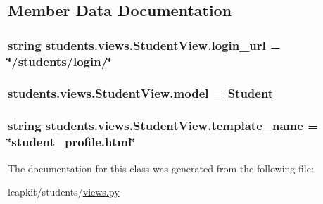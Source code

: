 \subsection{Member Data Documentation}
\hypertarget{classstudents_1_1views_1_1_student_view_a86ffef39c7d06b2b55d8fdb1f99c19c1}{
\subsubsection[{login\-\_\-url}]{\setlength{\rightskip}{0pt plus 5cm}string students.\-views.\-Student\-View.\-login\-\_\-url = \char`\"{}/students/login/\char`\"{}\hspace{0.3cm}{\ttfamily [static]}}}\label{classstudents_1_1views_1_1_student_view_a86ffef39c7d06b2b55d8fdb1f99c19c1}
\hypertarget{classstudents_1_1views_1_1_student_view_a870052ccf2e29eac0aefd221be2f916b}{
\subsubsection[{model}]{\setlength{\rightskip}{0pt plus 5cm}students.\-views.\-Student\-View.\-model = Student\hspace{0.3cm}{\ttfamily [static]}}}\label{classstudents_1_1views_1_1_student_view_a870052ccf2e29eac0aefd221be2f916b}
\hypertarget{classstudents_1_1views_1_1_student_view_aa2e9eac6cab9a9105aa89d3951bbb233}{
\subsubsection[{template\-\_\-name}]{\setlength{\rightskip}{0pt plus 5cm}string students.\-views.\-Student\-View.\-template\-\_\-name = \char`\"{}student\-\_\-profile.\-html\char`\"{}\hspace{0.3cm}{\ttfamily [static]}}}\label{classstudents_1_1views_1_1_student_view_aa2e9eac6cab9a9105aa89d3951bbb233}


The documentation for this class was generated from the following file\-:\begin{DoxyCompactItemize}
\item 
leapkit/students/\hyperlink{views_8py}{views.\-py}\end{DoxyCompactItemize}
